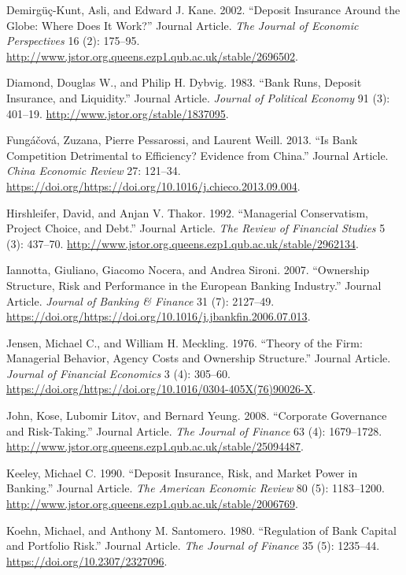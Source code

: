\documentclass{article}
\begin{document}
\leavevmode\hypertarget{ref-RN44}{}%
Demirgüç-Kunt, Asli, and Edward J. Kane. 2002. ``Deposit Insurance
Around the Globe: Where Does It Work?'' Journal Article. \emph{The
Journal of Economic Perspectives} 16 (2): 175--95.
\url{http://www.jstor.org.queens.ezp1.qub.ac.uk/stable/2696502}.

\leavevmode\hypertarget{ref-RN46}{}%
Diamond, Douglas W., and Philip H. Dybvig. 1983. ``Bank Runs, Deposit
Insurance, and Liquidity.'' Journal Article. \emph{Journal of Political
Economy} 91 (3): 401--19. \url{http://www.jstor.org/stable/1837095}.

\leavevmode\hypertarget{ref-RN47}{}%
Fungáčová, Zuzana, Pierre Pessarossi, and Laurent Weill. 2013. ``Is Bank
Competition Detrimental to Efficiency? Evidence from China.'' Journal
Article. \emph{China Economic Review} 27: 121--34.
\url{https://doi.org/https://doi.org/10.1016/j.chieco.2013.09.004}.

\leavevmode\hypertarget{ref-RN49}{}%
Hirshleifer, David, and Anjan V. Thakor. 1992. ``Managerial
Conservatism, Project Choice, and Debt.'' Journal Article. \emph{The
Review of Financial Studies} 5 (3): 437--70.
\url{http://www.jstor.org.queens.ezp1.qub.ac.uk/stable/2962134}.

\leavevmode\hypertarget{ref-RN51}{}%
Iannotta, Giuliano, Giacomo Nocera, and Andrea Sironi. 2007. ``Ownership
Structure, Risk and Performance in the European Banking Industry.''
Journal Article. \emph{Journal of Banking \& Finance} 31 (7): 2127--49.
\url{https://doi.org/https://doi.org/10.1016/j.jbankfin.2006.07.013}.

\leavevmode\hypertarget{ref-RN52}{}%
Jensen, Michael C., and William H. Meckling. 1976. ``Theory of the Firm:
Managerial Behavior, Agency Costs and Ownership Structure.'' Journal
Article. \emph{Journal of Financial Economics} 3 (4): 305--60.
\url{https://doi.org/https://doi.org/10.1016/0304-405X(76)90026-X}.

\leavevmode\hypertarget{ref-RN54}{}%
John, Kose, Lubomir Litov, and Bernard Yeung. 2008. ``Corporate
Governance and Risk-Taking.'' Journal Article. \emph{The Journal of
Finance} 63 (4): 1679--1728.
\url{http://www.jstor.org.queens.ezp1.qub.ac.uk/stable/25094487}.

\leavevmode\hypertarget{ref-RN56}{}%
Keeley, Michael C. 1990. ``Deposit Insurance, Risk, and Market Power in
Banking.'' Journal Article. \emph{The American Economic Review} 80 (5):
1183--1200.
\url{http://www.jstor.org.queens.ezp1.qub.ac.uk/stable/2006769}.

\leavevmode\hypertarget{ref-RN57}{}%
Koehn, Michael, and Anthony M. Santomero. 1980. ``Regulation of Bank
Capital and Portfolio Risk.'' Journal Article. \emph{The Journal of
Finance} 35 (5): 1235--44. \url{https://doi.org/10.2307/2327096}.
\end{document}
